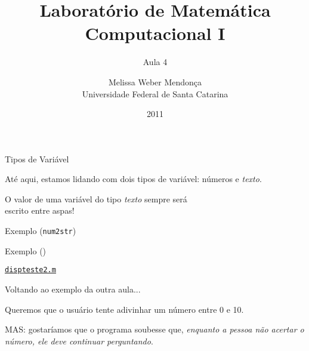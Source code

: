 \documentclass[hyperref={pdfpagelabels=false}]{beamer}
\title{Laboratório de Matemática Computacional I}
\subtitle{Aula 4}
\author[M. Weber Mendonça]{Melissa Weber Mendonça\\
Universidade Federal de Santa Catarina}
\date{2011}
\begin{document}
\setmonofont{Inconsolata}

\begin{frame}
  \titlepage
\end{frame}

\begin{frame}{Tipos de Variável}

	Até aqui, estamos lidando com dois tipos de variável: números e \emph{texto}.
  
	\begin{alertblock}{}
		\begin{center}
			O valor de uma variável do tipo \emph{texto} sempre será \\escrito
			entre	aspas!
		\end{center}
	\end{alertblock}

\end{frame}

\begin{frame}{Exemplo ({\texttt{num2str}})}
  
\end{frame}

\begin{frame}{Exemplo ({})}
	\begin{center} \href{listings/dispteste2.m}{\underline{\texttt{dispteste2.m}}} \end{center}
\end{frame}

\begin{frame}{Voltando ao exemplo da outra aula...}

  Queremos que o usuário tente adivinhar um número entre 0 e 10.
  
  MAS: gostaríamos que o programa soubesse que, \emph{enquanto a pessoa não acertar o número, ele deve continuar perguntando}.
\end{frame}
\end{document}
